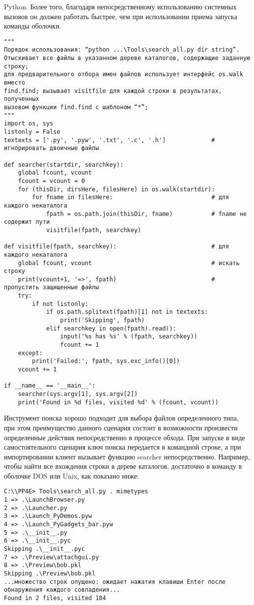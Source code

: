 \documentclass[12pt]{article}
\begin{document}
Python. Более того, благодаря непосредственному использованию системных вызовов он должен работать быстрее, чем при использовании
приема запуска команды оболочки.
\begin{verbatim}
"""
Порядок использования: “python ...\Tools\search_all.py dir string”.
Отыскивает все файлы в указанном дереве каталогов, содержащие заданную строку;
для предварительного отбора имен файлов использует интерфейс os.walk вместо
find.find; вызывает visitfile для каждой строки в результатах, полученных
вызовом функции find.find с шаблоном “*”;
"""
import os, sys
listonly = False
textexts = ['.py', '.pyw', '.txt', '.c', '.h']             # игнорировать двоичные файлы

def searcher(startdir, searchkey):
    global fcount, vcount
    fcount = vcount = 0
    for (thisDir, dirsHere, filesHere) in os.walk(startdir):
        for fname in filesHere:                            # для каждого некаталога
            fpath = os.path.join(thisDir, fname)           # fname не содержит пути
            visitfile(fpath, searchkey)

def visitfile(fpath, searchkey):                           # для каждого некаталога
    global fcount, vcount                                  # искать строку
    print(vcount+1, '=>', fpath)                           # пропустить защищенные файлы
    try:
        if not listonly:
            if os.path.splitext(fpath)[1] not in textexts:
                print('Skipping', fpath)
            elif searchkey in open(fpath).read():
                input('%s has %s' % (fpath, searchkey))
                fcount += 1
    except:
        print('Failed:', fpath, sys.exc_info()[0])
    vcount += 1

if __name__ == '__main__':
    searcher(sys.argv[1], sys.argv[2])
    print('Found in %d files, visited %d' % (fcount, vcount))
\end{verbatim}
Инструмент поиска хорошо подходит для выбора файлов определенного
типа, при этом преимущество данного сценария состоит в возможности
произвести определенные действия непосредственно в процессе обхода.
При запуске в виде самостоятельного сценария ключ поиска передается
в командной строке, а при импортировании клиент вызывает функцию
searcher непосредственно. Например, чтобы найти все вхождения строки в дереве каталогов, достаточно в команду в оболочке DOS
или Unix, как показано ниже:
\begin{verbatim}
C:\\PP4E> Tools\search_all.py . mimetypes
1 => .\LaunchBrowser.py
2 => .\Launcher.py
3 => .\Launch_PyDemos.pyw
4 => .\Launch_PyGadgets_bar.pyw
5 => .\__init__.py
6 => .\__init__.pyc
Skipping .\__init__.pyc
7 => .\Preview\attachgui.py
8 => .\Preview\bob.pkl
Skipping .\Preview\bob.pkl
...множество строк опущено: ожидает нажатия клавиши Enter после
обнаружения каждого совпадения...
Found in 2 files, visited 184
\end{verbatim}
\end{document}
